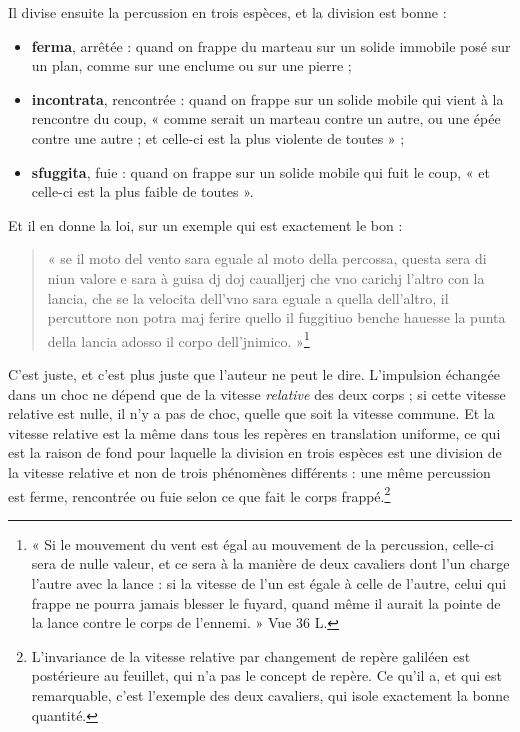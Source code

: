 \documentclass[11pt,a4paper]{article}
\begin{document}
Il divise ensuite la percussion en trois espèces, et la division est bonne :

\begin{itemize}
  \item \textbf{ferma}, arrêtée : quand on frappe du marteau sur un solide
    immobile posé sur un plan, comme sur une enclume ou sur une pierre ;
  \item \textbf{incontrata}, rencontrée : quand on frappe sur un solide mobile
    qui vient à la rencontre du coup, « comme serait un marteau contre un autre,
    ou une épée contre une autre ; et celle-ci est la plus violente de toutes » ;
  \item \textbf{sfuggita}, fuie : quand on frappe sur un solide mobile qui fuit
    le coup, « et celle-ci est la plus faible de toutes ».
\end{itemize}

Et il en donne la loi, sur un exemple qui est exactement le bon :

\begin{quote}
« se il moto del vento sara eguale al moto della percossa, questa sera di niun
valore e sara à guisa dj doj caualljerj che vno carichj l'altro con la lancia,
che se la velocita dell'vno sara eguale a quella dell'altro, il percuttore non
potra maj ferire quello il fuggitiuo benche hauesse la punta della lancia adosso
il corpo dell'jnimico. »\footnote{« Si le mouvement du vent est égal au mouvement
de la percussion, celle-ci sera de nulle valeur, et ce sera à la manière de deux
cavaliers dont l'un charge l'autre avec la lance : si la vitesse de l'un est
égale à celle de l'autre, celui qui frappe ne pourra jamais blesser le fuyard,
quand même il aurait la pointe de la lance contre le corps de l'ennemi. »
Vue 36 L.}
\end{quote}

C'est juste, et c'est plus juste que l'auteur ne peut le dire. L'impulsion
échangée dans un choc ne dépend que de la vitesse \emph{relative} des deux
corps ; si cette vitesse relative est nulle, il n'y a pas de choc, quelle que
soit la vitesse commune. Et la vitesse relative est la même dans tous les
repères en translation uniforme, ce qui est la raison de fond pour laquelle la
division en trois espèces est une division de la vitesse relative et non de trois
phénomènes différents : une même percussion est ferme, rencontrée ou fuie selon
ce que fait le corps frappé.\footnote{L'invariance de la vitesse relative par
changement de repère galiléen est postérieure au feuillet, qui n'a pas le
concept de repère. Ce qu'il a, et qui est remarquable, c'est l'exemple des deux
cavaliers, qui isole exactement la bonne quantité.}
\end{document}
